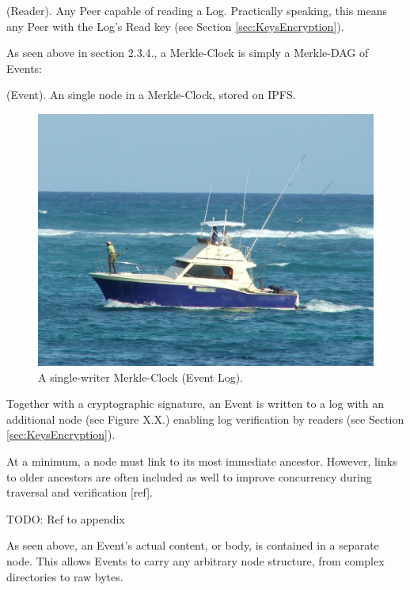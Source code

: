 \documentclass{comjnl}
\begin{document}
\begin{definition}
(Reader). Any Peer capable of reading a Log. Practically speaking, this means any Peer with the Log’s Read key (see Section  \ref{sec:KeysEncryption}).
\end{definition}


As seen above in section 2.3.4., a Merkle-Clock is simply a Merkle-DAG of Events:

\begin{definition}
 (Event). An single node in a Merkle-Clock, stored on IPFS.
\end{definition}

\begin{figure}
  \includegraphics[width=\linewidth]{boat.jpg}
  \caption{A single-writer Merkle-Clock (Event Log).}
  \label{fig:boat1}
\end{figure}

Together with a cryptographic signature, an Event is written to a log with an additional node (see Figure X.X.) enabling log verification by readers (see Section  \ref{sec:KeysEncryption}).

At a minimum, a node must link to its most immediate ancestor. However, links to older ancestors are often included as well to improve concurrency during traversal and verification [ref].

TODO: Ref to appendix

As seen above, an Event’s actual content, or body, is contained in a separate node. This allows Events to carry any arbitrary node structure, from complex directories to raw bytes.
\end{document}
